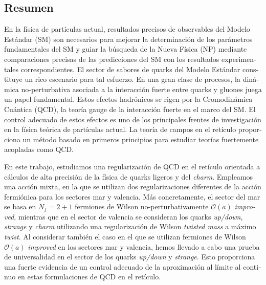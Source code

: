 \vfill

\begin{otherlanguage}{spanish}
\chapter*{Resumen}

En la física de partículas actual, resultados precisos de observables del Modelo Estándar (SM) son necesarios para mejorar la determinación de los parámetros fundamentales del SM y guiar la búsqueda de la Nueva Física (NP) mediante comparaciones precisas de las predicciones del SM con los resultados experimentales correspondientes. El sector de sabores de quarks del Modelo Estándar constituye un rico escenario para tal esfuerzo. En una gran clase de procesos, la dinámica no-perturbativa asociada a la interacción fuerte entre quarks y gluones juega un papel fundamental. Estos efectos hadrónicos se rigen por la Cromodinámica Cuántica (QCD), la teoría gauge de la interacción fuerte en el marco del SM. El control adecuado de estos efectos es uno de los principales frentes de investigación en la física teórica de partículas actual. La teoría de campos en el retículo proporciona un método basado en primeros principios para estudiar teorías fuertemente acopladas como QCD.

En este trabajo, estudiamos una regularización de QCD en el retículo orientada a cálculos de alta precisión de la física de quarks ligeros y del \textit{charm}. Empleamos una acción mixta, en la que se utilizan dos regularizaciones diferentes de la acción fermiónica para los sectores mar y valencia. Más concretamente, el sector del mar se basa en $N_f = 2 + 1$ fermiones de Wilson no-perturbativamente $\mathcal{O}(a)$ \textit{improved}, mientras que en el sector de valencia se consideran los quarks \textit{up/down}, \textit{strange} y \textit{charm} utilizando una regularización de Wilson \textit{twisted mass} a máximo \textit{twist}. Al considerar también el caso en el que se utilizan fermiones de Wilson $\mathcal{O}(a)$ \textit{improved} en los sectores mar y valencia, hemos llevado a cabo una prueba de universalidad en el sector de los quarks \textit{up/down} y \textit{strange}. Esto proporciona una fuerte evidencia de un control adecuado de la aproximación al límite al continuo en estas formulaciones de QCD en el retículo.


\end{otherlanguage}
